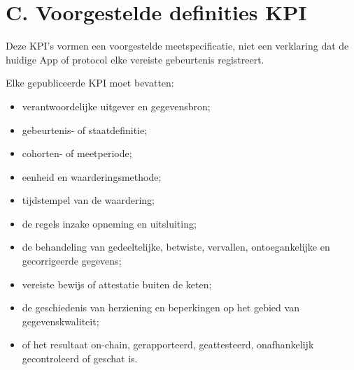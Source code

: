 \documentclass[11pt]{article}
\begin{document}
\section*{C. Voorgestelde definities KPI}

Deze KPI's vormen een voorgestelde meetspecificatie, niet een verklaring dat de huidige App of protocol elke vereiste gebeurtenis registreert.

Elke gepubliceerde KPI moet bevatten:

\begin{itemize}[leftmargin=*]
\item verantwoordelijke uitgever en gegevensbron;
\item gebeurtenis- of staatdefinitie;
\item cohorten- of meetperiode;
\item eenheid en waarderingsmethode;
\item tijdstempel van de waardering;
\item de regels inzake opneming en uitsluiting;
\item de behandeling van gedeeltelijke, betwiste, vervallen, ontoegankelijke en gecorrigeerde gegevens;
\item vereiste bewijs of attestatie buiten de keten;
\item de geschiedenis van herziening en beperkingen op het gebied van gegevenskwaliteit;
\item of het resultaat on-chain, gerapporteerd, geattesteerd, onafhankelijk gecontroleerd of geschat is.
\end{itemize}
\end{document}
